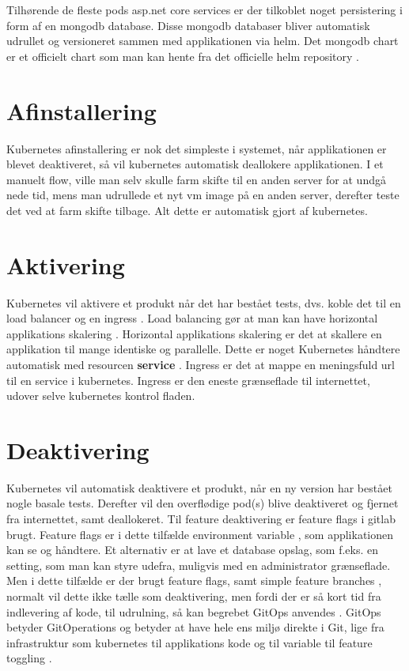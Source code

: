 Tilhørende de fleste pods asp.net core services er der tilkoblet noget persistering i form af en mongodb database. Disse mongodb databaser bliver automatisk udrullet og versioneret sammen med applikationen via helm. Det mongodb chart er et officielt chart som man kan hente fra det officielle helm repository \cite{documentation_terms}.

\section{Afinstallering}

Kubernetes afinstallering er nok det simpleste i systemet, når applikationen er blevet deaktiveret, så vil kubernetes automatisk deallokere applikationen. I et manuelt flow, ville man selv skulle farm skifte til en anden server for at undgå nede tid, mens man udrullede et nyt vm image på en anden server, derefter teste det ved at farm skifte tilbage. Alt dette er automatisk gjort af kubernetes.

\section{Aktivering}

Kubernetes vil aktivere et produkt når det har bestået tests, dvs. koble det til en load balancer \cite{documentation_terms} og en ingress \cite{documentation_terms}. Load balancing gør at man kan have horizontal applikations skalering \cite{documentation_terms}. Horizontal applikations skalering er det at skallere en applikation til mange identiske og parallelle. Dette er noget Kubernetes håndtere automatisk med resourcen \textbf{service} \cite{documentation_terms}. Ingress er det at mappe en meningsfuld url til en service i kubernetes. Ingress er den eneste grænseflade til internettet, udover selve kubernetes kontrol fladen.


\section{Deaktivering}

Kubernetes vil automatisk deaktivere et produkt, når en ny version har bestået nogle basale tests. Derefter vil den overflødige pod(s) blive deaktiveret og fjernet fra internettet, samt deallokeret. Til feature deaktivering er feature flags i gitlab brugt. Feature flags er i dette tilfælde environment variable \cite{documentation_terms}, som applikationen kan se og håndtere. Et alternativ er at lave et database opslag, som f.eks. en setting, som man kan styre udefra, muligvis med en administrator grænseflade. Men i dette tilfælde er der brugt feature flags, samt simple feature branches \cite{documentation_terms}, normalt vil dette ikke tælle som deaktivering, men fordi der er så kort tid fra indlevering af kode, til udrulning, så kan begrebet GitOps anvendes \cite{documentation_terms}. GitOps betyder GitOperations og betyder at have hele ens miljø direkte i Git, lige fra infrastruktur som kubernetes til applikations kode og til variable til feature toggling \cite{documentation_terms}.

